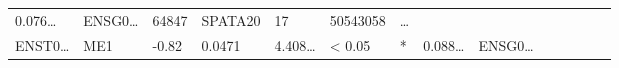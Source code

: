 \documentclass[
]{article}
\begin{document}
\begin{longtable}[]{@{}llllllllllllll@{}}
\begin{minipage}[t]{0.05\columnwidth}
0.076\ldots{}\strut
\end{minipage} & \begin{minipage}[t]{0.05\columnwidth}\raggedright
ENSG0\ldots{}\strut
\end{minipage} & \begin{minipage}[t]{0.05\columnwidth}\raggedright
64847\strut
\end{minipage} & \begin{minipage}[t]{0.05\columnwidth}\raggedright
SPATA20\strut
\end{minipage} & \begin{minipage}[t]{0.05\columnwidth}\raggedright
17\strut
\end{minipage} & \begin{minipage}[t]{0.05\columnwidth}\raggedright
50543058\strut
\end{minipage} & \begin{minipage}[t]{0.02\columnwidth}\raggedright
\ldots{}\strut
\end{minipage}\tabularnewline
\begin{minipage}[t]{0.05\columnwidth}\raggedright
ENST0\ldots{}\strut
\end{minipage} & \begin{minipage}[t]{0.04\columnwidth}\raggedright
ME1\strut
\end{minipage} & \begin{minipage}[t]{0.04\columnwidth}\raggedright
-0.82\strut
\end{minipage} & \begin{minipage}[t]{0.04\columnwidth}\raggedright
0.0471\strut
\end{minipage} & \begin{minipage}[t]{0.05\columnwidth}\raggedright
4.408\ldots{}\strut
\end{minipage} & \begin{minipage}[t]{0.05\columnwidth}\raggedright
\textless{} 0.05\strut
\end{minipage} & \begin{minipage}[t]{0.03\columnwidth}\raggedright
*\strut
\end{minipage} & \begin{minipage}[t]{0.05\columnwidth}\raggedright
0.088\ldots{}\strut
\end{minipage} & \begin{minipage}[t]{0.05\columnwidth}\raggedright
ENSG0\ldots{}\strut
\end{minipage} & \begin{minipage}[t]{0.05\columnwidth}\raggedright

\end{minipage}
\end{longtable}
\end{document}
